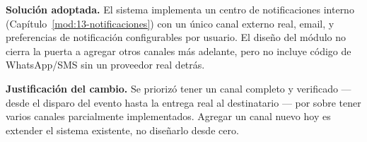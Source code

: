 \textbf{Solución adoptada.} El sistema implementa un centro de notificaciones interno (Capítulo~\ref{mod:13-notificaciones}) con un único canal externo real, email, y preferencias de notificación configurables por usuario. El diseño del módulo no cierra la puerta a agregar otros canales más adelante, pero no incluye código de WhatsApp/SMS sin un proveedor real detrás.

\textbf{Justificación del cambio.} Se priorizó tener un canal completo y verificado --- desde el disparo del evento hasta la entrega real al destinatario --- por sobre tener varios canales parcialmente implementados. Agregar un canal nuevo hoy es extender el sistema existente, no diseñarlo desde cero.
